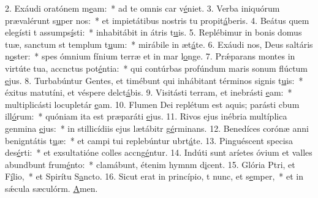 2. Exáudi oratónem m\uline{e}am:~* ad te omnis car v\uline{é}niet.
3. Verba iniquórum prævalérunt s\uline{u}per nos:~* et impietátibus nostris tu propit\uline{á}beris.
4. Beátus quem elegísti t assumps\uline{í}sti:~* inhabitábit in átris t\uline{u}is.
5. Replébimur in bonis domus tuæ, sanctum st templum t\uline{u}um:~* mirábile in æt\uline{á}te.
6. Exáudi nos, Deus saltáris n\uline{o}ster:~* spes ómnium fínium terræ et in mar l\uline{o}nge.
7. Prǽparans montes in virtúte tua, accnctus pot\uline{é}ntia:~* qui contúrbas profúndum maris sonum flúctum \uline{e}jus.
8. Turbabúntur Gentes, et timébunt qui inhábitant términos  signis t\uline{u}is:~* éxitus matutíni, et véspere delct\uline{á}bis.
9. Visitásti terram, et inebrásti \uline{e}am:~* multiplicásti locupletár \uline{e}am.
10. Flumen Dei replétum est aquis; parásti cbum ill\uline{ó}rum:~* quóniam ita est præparáti \uline{e}jus.
11. Rivos ejus inébria multíplica genmina \uline{e}jus:~* in stillicídiis ejus lætábitr g\uline{é}rminans.
12. Benedíces corónæ anni benigntátis t\uline{u}æ:~* et campi tui replebúntur ubrt\uline{á}te.
13. Pinguéscent specisa des\uline{é}rti:~* et exsultatióne colles accng\uline{é}ntur.
14. Indúti sunt aríetes óvium et valles abundbunt frum\uline{é}nto:~* clamábunt, étenim hymnm d\uline{i}cent.
15. Glória Ptri, et F\uline{í}lio,~* et Spirítu S\uline{a}ncto.
16. Sicut erat in princípio, t nunc, et s\uline{e}mper,~* et in sǽcula sæculórm. \uline{A}men.
